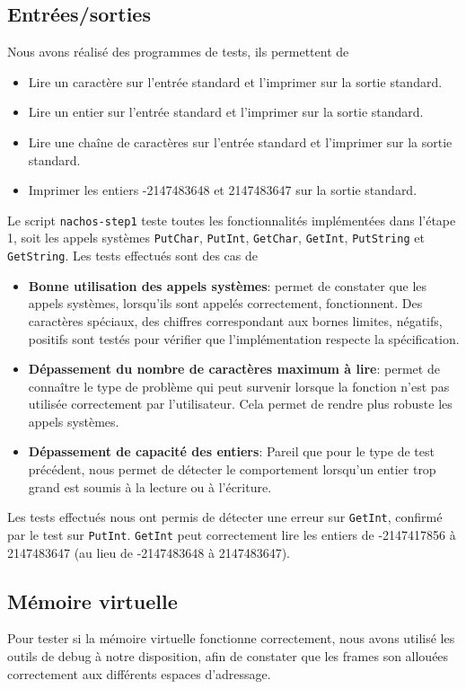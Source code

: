 \documentclass{report}
\begin{document}
\subsection*{Entrées/sorties}
\noindent
Nous avons réalisé des programmes de tests, ils permettent de
\begin{itemize}
 \item Lire un caractère sur l'entrée standard et l'imprimer sur la sortie standard.
 \item Lire un entier sur l'entrée standard et l'imprimer sur la sortie standard.
 \item Lire une chaîne de caractères sur l'entrée standard et l'imprimer sur la sortie
 standard.
 \item Imprimer les entiers -2147483648 et 2147483647 sur la sortie standard.
\end{itemize}
Le script \texttt{nachos-step1} teste toutes les fonctionnalités implémentées dans l'étape 1, soit les appels systèmes \texttt{PutChar}, \texttt{PutInt}, \texttt{GetChar}, \texttt{GetInt}, \texttt{PutString} et \texttt{GetString}.
Les tests effectués sont des cas de
\begin{itemize}
 \item \textbf{Bonne utilisation des appels systèmes}: permet de constater que les appels systèmes, lorsqu'ils sont appelés correctement, fonctionnent. Des caractères spéciaux, des chiffres correspondant aux bornes limites, négatifs, positifs sont testés pour vérifier que l'implémentation respecte la spécification.
 \item \textbf{Dépassement du nombre de caractères maximum à lire}: permet de connaître le type de problème qui peut survenir lorsque la fonction n'est pas utilisée correctement par l'utilisateur. Cela permet de rendre plus robuste les appels systèmes.
 \item \textbf{Dépassement de capacité des entiers}: Pareil que pour le type de test précédent, nous permet de détecter le comportement lorsqu'un entier trop grand est soumis à la lecture ou à l'écriture.
\end{itemize}
Les tests effectués nous ont permis de détecter une erreur sur \texttt{GetInt}, confirmé par le test sur \texttt{PutInt}. \texttt{GetInt} peut correctement lire les entiers de -2147417856 à 2147483647 (au lieu de -2147483648 à 2147483647).

\subsection*{Mémoire virtuelle}
Pour tester si la mémoire virtuelle fonctionne correctement, nous avons utilisé les outils de debug à notre disposition, afin de constater que les frames son allouées correctement aux différents espaces d'adressage.\\
\end{document}
